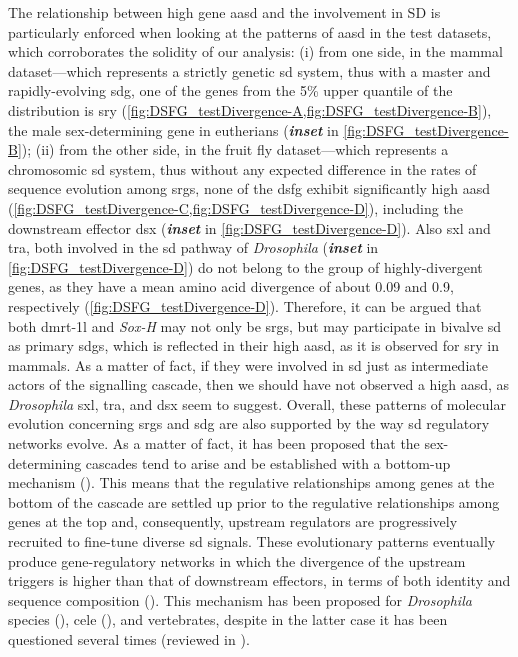 The relationship between high gene \gls{aasd} and the involvement in SD is particularly enforced when looking at the patterns of \gls{aasd} in the test datasets, which corroborates the solidity of our analysis: (i) from one side, in the mammal dataset—which represents a strictly genetic \gls{sd} system, thus with a master and rapidly-evolving \gls{sdg}, one of the genes from the 5\% upper quantile of the distribution is \gls{sry} (\cref{fig:DSFG_testDivergence-A,fig:DSFG_testDivergence-B}), the male sex-determining gene in eutherians (\textbf{\textit{inset}} in \cref{fig:DSFG_testDivergence-B}); (ii) from the other side, in the fruit fly dataset—which represents a chromosomic \gls{sd} system, thus without any expected difference in the rates of sequence evolution among \glspl{srg}, none of the \gls{dsfg} exhibit significantly high \gls{aasd} (\cref{fig:DSFG_testDivergence-C,fig:DSFG_testDivergence-D}), including the downstream effector \gls{dsx} (\textit{\textbf{inset}} in \cref{fig:DSFG_testDivergence-D}). Also \gls{sxl} and \gls{tra}, both involved in the \gls{sd} pathway of \textit{Drosophila} (\textit{\textbf{inset}} in \cref{fig:DSFG_testDivergence-D}) do not belong to the group of highly-divergent genes, as they have a mean amino acid divergence of about 0.09 and 0.9, respectively (\cref{fig:DSFG_testDivergence-D}). Therefore, it can be argued that both \gls{dmrt-1l} and \textit{Sox-H} may not only be \glspl{srg}, but may participate in bivalve \gls{sd} as primary \glspl{sdg}, which is reflected in their high \gls{aasd}, as it is observed for \gls{sry} in mammals. As a matter of fact, if they were involved in \gls{sd} just as intermediate actors of the signalling cascade, then we should have not observed a high \gls{aasd}, as \textit{Drosophila} \gls{sxl}, \gls{tra}, and \gls{dsx} seem to suggest. Overall, these patterns of molecular evolution concerning \glspl{srg} and \gls{sdg} are also supported by the way \gls{sd} regulatory networks evolve. As a matter of fact, it has been proposed that the sex-determining cascades tend to arise and be established with a bottom-up mechanism (). This means that the regulative relationships among genes at the bottom of the cascade are settled up prior to the regulative relationships among genes at the top and, consequently, upstream regulators are progressively recruited to fine-tune diverse \gls{sd} signals. These evolutionary patterns eventually produce gene-regulatory networks in which the divergence of the upstream triggers is higher than that of downstream effectors, in terms of both identity and sequence composition (). This mechanism has been proposed for \textit{Drosophila} species (), \gls{cele} (), and vertebrates, despite in the latter case it has been questioned several times (reviewed in ).

